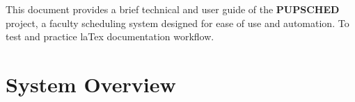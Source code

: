 \documentclass[12pt,letterpaper]{article}
\begin{document}
\coverpage


\renewcommand{\contentsname}{\centering\sffamily\Large Table of Contents}
\renewcommand{\cftsecleader}{\cftdotfill{\cftdotsep}}

\renewcommand{\cftsecfont}{\sffamily\bfseries\color{darkgray}}
\renewcommand{\cftsecpagefont}{\sffamily\bfseries\color{darkgray}}

\renewcommand{\cftsubsecfont}{\sffamily\color{gray}}
\renewcommand{\cftsubsecpagefont}{\sffamily\color{gray}}

\renewcommand{\cftsubsubsecfont}{\sffamily\color{lightgray}}
\renewcommand{\cftsubsubsecpagefont}{\sffamily\color{lightgray}}

\setlength{\cftbeforesecskip}{8pt}

\newpage

\begin{tcolorbox}[githubnote]
This document provides a brief technical and user guide of the \textbf{PUPSCHED} project,
a faculty scheduling system designed for ease of use and automation. To test and practice laTex documentation workflow.
\end{tcolorbox}

\vspace{3em}
\section{System Overview}
\end{document}
